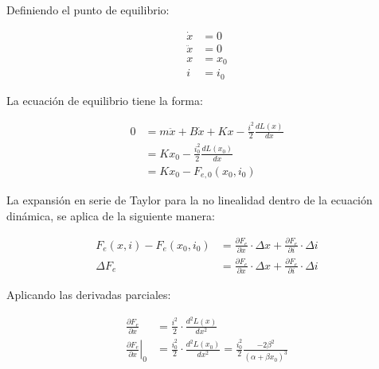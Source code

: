 \documentclass[journal]{IEEEtran}
\begin{document}
\setlength{\parskip}{1em}

Definiendo el punto de equilibrio:

\[
\begin{aligned}
    \dot{x} & = 0 \\
    \ddot{x} & = 0 \\
    x & = x_{0} \\
    i & = i_{0} 
\end{aligned}
\]

La ecuación de equilibrio tiene la forma:

\begin{equation}
\begin{aligned}
        0 &= m \ddot{x} + B \dot{x} + Kx - \frac{i^2}{2} \frac{dL(x)}{dx} \\
          &= Kx_{0} - \frac{i_{0}^2}{2} \frac{dL(x_{0})}{dx} \\
          &= Kx_{0} - F_{e, 0}(x_{0}, i_{0})
\end{aligned}
\label{eq:equilibrio}
\end{equation}

La expansión en serie de Taylor para la no linealidad dentro de la ecuación dinámica,
se aplica de la siguiente manera:

\begin{equation}
\begin{aligned}
        F_{e}(x, i) - F_{e}(x_{0}, i_{0}) &= \frac{\partial F_{e}}{\partial x} \cdot \Delta x + \frac{\partial F_{e}}{\partial i} \cdot \Delta i \\
        \Delta F_{e}                      &= \frac{\partial F_{e}}{\partial x} \cdot \Delta x + \frac{\partial F_{e}}{\partial i} \cdot \Delta i 
\end{aligned}
\label{eq:serieTaylor}
\end{equation}

Aplicando las derivadas parciales:

\begin{equation}
\begin{aligned}
    \frac{\partial F_{e}}{\partial x}                      &= \frac{i^2}{2} \cdot \frac{d^2L(x)}{dx^2} \\
    \left. \frac{\partial F_{e}}{\partial x} \right|_{0} &= \frac{i_{0}^2}{2} \cdot \frac{d^2L(x_{0})}{dx^2} = \frac{i_{0}^2}{2} \frac{-2 \beta^2}{(\alpha + \beta x_{0})^3}
\end{aligned}
\label{eq:derivadaParcial_x}
\end{equation}
\end{document}
